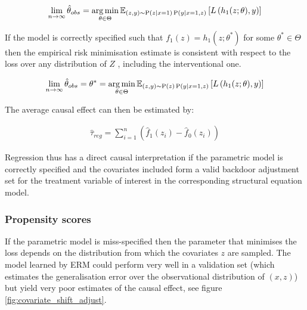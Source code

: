 \documentclass[11pt,a4paper,twoside]{report}
\newcommand{\Esub}[2]{\mathbb E_{#1}\left[{#2}\right]}
\newcommand{\argmin}{\operatornamewithlimits{arg\,min}}
\newcommand{\eqn}[1]{\begin{align}#1\end{align}}
\renewcommand{\P}[1]{\operatorname{P}\left(#1\right)}
\theoremstyle{plain}
\theoremstyle{definition}
\begin{document}
\eqn{
\lim_{n \rightarrow \infty}\hat{\theta}_{obs} = \argmin_{\theta \in \Theta} \Esub{(z,y) \sim \P{z|x=1}\P{y|x=1,z}}{L\left(h_1(z;\theta),y \right)}
}

If the model is correctly specified such that $f_1(z) = h_1(z;\theta^*)$ for some  $\theta^* \in \Theta$ then the empirical risk minimisation estimate is consistent with respect to the loss over any distribution of $Z$  \citep{Sugiyama2007}, including the interventional one. 

\eqn{
\lim_{n \rightarrow \infty}\hat{\theta}_{obs} = \theta^* = \argmin_{\theta \in \Theta} \Esub{(z,y) \sim \P{z}\P{y|x=1,z}}{L\left(h_1(z;\theta),y \right)}
}

The average causal effect can then be estimated by:

\eqn{
\label{eqn:cef_empirical_regression}
\hat{\tau}_{reg} = \sum_{i=1}^n \left(\hat{f}_1(z_i) - \hat{f}_0(z_i)\right)
}

Regression thus has a direct causal interpretation if the parametric model is correctly specified and the covariates included form a valid backdoor adjustment set for the treatment variable of interest in the corresponding structural equation model. 

\subsubsection{Propensity scores}
If the parametric model is miss-specified then the parameter that minimises the loss depends on the distribution from which the covariates $z$ are sampled. The model learned by ERM could perform very well in a validation set (which estimates the generalisation error over the observational distribution of $(x,z)$) but yield very poor estimates of the causal effect, see figure \ref{fig:covariate_shift_adjust}. 
\end{document}
